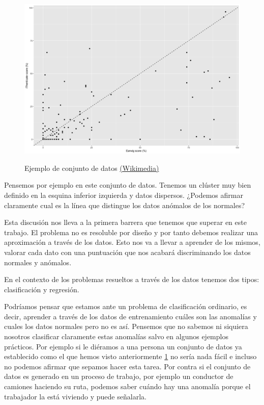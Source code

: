 \begin{figure}[!h]
	\centering
	\includegraphics[scale=0.3]{imagenes/1_introduccion}
	\label{1_introduccion}
	\caption{Ejemplo de conjunto de datos \href{https://commons.wikimedia.org/wiki/File:Earwig_ithenticate_scatterplot.png}{(Wikimedia)}}
\end{figure}

Pensemos por ejemplo en este conjunto de datos. Tenemos un clúster muy bien definido en la esquina inferior izquierda y datos dispersos. ¿Podemos afirmar claramente cual es la línea que distingue los datos anómalos de los normales? 

Esta discusión nos lleva a la primera barrera que tenemos que superar en este trabajo. El problema no es resoluble por diseño y por tanto debemos realizar una aproximación a través de los datos. Esto nos va a llevar a aprender de los mismos, valorar cada dato con una puntuación que nos acabará discriminando los datos normales y anómalos.

En el contexto de los problemas resueltos a través de los datos tenemos dos tipos: clasificación y regresión. 

Podríamos pensar que estamos ante un problema de clasificación ordinario, es decir, aprender a través de los datos de entrenamiento cuáles son las anomalías y cuales los datos normales pero no es así. Pensemos que no sabemos ni siquiera nosotros clasificar claramente estas anomalías salvo en algunos ejemplos prácticos. Por ejemplo si le diéramos a una persona un conjunto de datos ya establecido como el que hemos visto anteriormente \ref{1_introduccion} no sería nada fácil e incluso no podemos afirmar que sepamos hacer esta tarea. Por contra si el conjunto de datos es generado en un proceso de trabajo, por ejemplo un conductor de camiones haciendo su ruta, podemos saber cuándo hay una anomalía porque el trabajador la está viviendo y puede señalarla.

